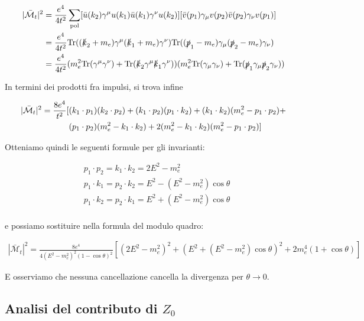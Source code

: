 \documentclass[11pt]{report}
\begin{document}
\begin{align}
    |\mathcal{\bar{M}}_t|^2 &= \frac{e^4}{4t^2}\sum_{\text{pol}}[\bar{u}(k_2)\gamma^\mu u(k_1)\bar{u}(k_1)\gamma^\nu u(k_2)][\bar{v}(p_1)\gamma_\mu v(p_2)\bar{v}(p_2)\gamma_\nu v(p_1)] \notag \\
    &= \frac{e^4}{4t^2}\text{Tr}((\slashed{k}_2 +m_e)\gamma^\mu (\slashed{k}_1 + m_e)\gamma^\nu)\text{Tr}((\slashed{p}_1 - m_e)\gamma_\mu (\slashed{p}_2 - m_e)\gamma_\nu) \notag \\
    &= \frac{e^4}{4t^2}(m_e^2\text{Tr}(\gamma^\mu \gamma^\nu) + \text{Tr}(\slashed{k}_2 \gamma^\mu \slashed{k}_1 \gamma^\nu))(m_e^2\text{Tr}(\gamma_\mu \gamma_\nu) + \text{Tr}(\slashed{p}_1 \gamma_\mu \slashed{p}_2 \gamma_\nu))
\end{align}

In termini dei prodotti fra impulsi, si trova infine 

\begin{align}
    |\mathcal{\bar{M}}_t|^2 = \frac{8e^4}{t^2}[&(k_1\cdot p_1)(k_2\cdot p_2) + (k_1\cdot p_2)(p_1\cdot k_2) + (k_1\cdot k_2)(m_e^2 - p_1\cdot p_2) +  \notag \\ 
    &(p_1\cdot p_2)(m_e^2 - k_1\cdot k_2) + 2(m_e^2 - k_1\cdot k_2)(m_e^2 - p_1\cdot p_2)]
\end{align}

Otteniamo quindi le seguenti formule per gli invarianti: 

\begin{align}
    &p_1\cdot p_2 = k_1\cdot k_2 = 2E^2 - m_e^2 \\
    &p_1\cdot k_1 = p_2\cdot k_2 = E^2 - (E^2-m_e^2)\cos\theta \\
    &p_1\cdot k_2 = p_2\cdot k_1 = E^2 + (E^2-m_e^2)\cos\theta \\
    &
\end{align}

e possiamo sostituire nella formula del modulo quadro: 

\begin{align}
    |\mathcal{\bar{M}}_t|^2 = \frac{8e^4}{4(E^2-m_e^2)^2 (1-\cos\theta)^2}[(2E^2-m_e^2)^2 + (E^2 + (E^2-m_e^2)\cos\theta)^2 + 2m_e^4(1+\cos\theta)] 
\end{align}

E osserviamo che nessuna cancellazione cancella la divergenza per \(\theta \rightarrow 0\). 

\subsection{Analisi del contributo di \(Z_0\)}
\end{document}

